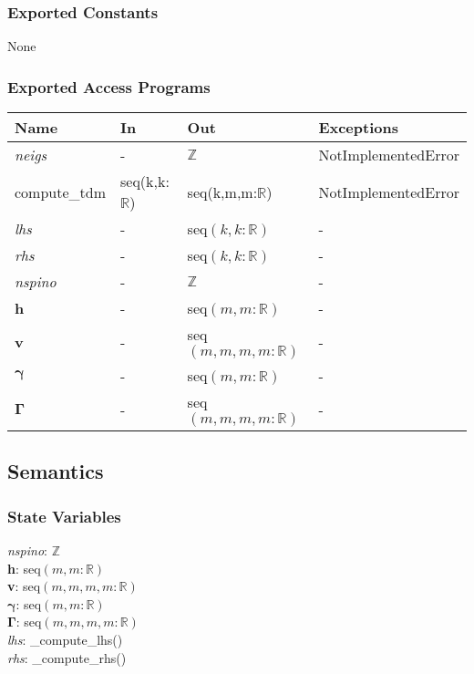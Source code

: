 \documentclass[12pt, titlepage]{article}
\begin{document}
\subsubsection{Exported Constants}
None

\subsubsection{Exported Access Programs}

\begin{center}
	\begin{tabular}{p{2.3cm} p{4cm} p{4cm} p{2cm}}
		\hline
		\textbf{Name} & \textbf{In} & \textbf{Out} & \textbf{Exceptions} \\
		\hline
		\textit{neigs} & -& $\mathbb{Z}$& NotImplementedError\\
		compute\_tdm& seq(k,k:$\mathbb{R}$)& seq(k,m,m:$\mathbb{R}$)& 
		NotImplementedError\\
		\textit{lhs} & -& seq$(k,k:\mathbb{R})$& -\\
		\textit{rhs} & -& seq$(k,k:\mathbb{R})$& -\\
		\textit{nspino}& -& $\mathbb{Z}$& -\\
		\textbf{h}& -& seq$(m,m:\mathbb{R})$& -\\
		\textbf{v}& -& seq$(m,m,m,m:\mathbb{R})$& -\\
		$\boldsymbol{\gamma}$& -& seq$(m,m:\mathbb{R})$& -\\
		$\boldsymbol{\Gamma}$& -& seq$(m,m,m,m:\mathbb{R})$& -\\
		\hline
	\end{tabular}
\end{center}

\subsection{Semantics}

\subsubsection{State Variables}
\textit{nspino}: $\mathbb{Z}$\\
\textbf{h}: seq$(m,m:\mathbb{R})$\\
\textbf{v}: seq$(m,m,m,m:\mathbb{R})$\\
$\boldsymbol{\gamma}$: seq$(m,m:\mathbb{R})$\\
$\boldsymbol{\Gamma}$: seq$(m,m,m,m:\mathbb{R})$\\
\textit{lhs}: \_compute\_lhs()\\
\textit{rhs}: \_compute\_rhs()
\end{document}
